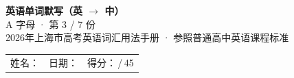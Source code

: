 \documentclass[10pt,a4paper]{article}
\begin{document}
\pagestyle{plain}

\begin{center}
{\LARGE\bfseries 英语单词默写（英 $\to$ 中）}\\[0.22em]
{\large A 字母 · 第 3 / 7 份}\\[0.18em]
{\small 2026年上海市高考英语词汇用法手册 · 参照普通高中英语课程标准}
\end{center}

\vspace{0.25em}
\noindent\begin{tabular}{@{}p{}@{}p{}@{}p{}@{}}
姓名：\underline{\hspace{2.0cm}} & 日期：\underline{\hspace{2.0cm}} & 得分：\underline{\hspace{1.3cm}}\,/\,45 \\
\end{tabular}

\vspace{0.3em}

\vspace{0.08em}
\end{document}
